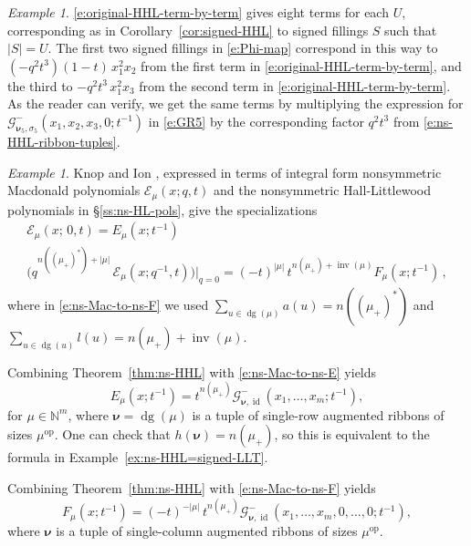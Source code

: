 \documentclass[12pt]{amsart}
\theoremstyle{definition}
\theoremstyle{remark}
\newtheorem{example}[thm]{Example}
\newcommand{\NN}{{\mathbb N}}
\newcommand{\nubold}{{\boldsymbol \nu }}
\newcommand{\Ecal}{{\mathcal E}}
\newcommand{\Gcal}{{\mathcal G}}
\DeclareMathOperator{\dg}{dg}
\DeclareMathOperator{\inv}{inv}
\DeclareMathOperator{\op}{op}
\begin{document}
\begin{example}
\eqref{e:original-HHL-term-by-term} gives eight terms for each $U$,
corresponding as in Corollary~\ref{cor:signed-HHL} to signed fillings
$S$ such that $|S| = U$.  The first two signed fillings in
\eqref{e:Phi-map} correspond in this way to $(-q^{2}t^{3})(1- t)\,
x_{1}^{2}x_{2}$ from the first term in
\eqref{e:original-HHL-term-by-term}, and the third to $-q^{2}t^{3}\,
x_{1}^{2}x_{3}$ from the second term in
\eqref{e:original-HHL-term-by-term}.  As the reader can verify, we get
the same terms by multiplying the expression for $\Gcal _{\nubold
_{5},\sigma _{5}}^{-}(x_{1},x_{2},x_{3},0;t^{-1})$ in \eqref{e:GR5} by
the corresponding factor $q^{2}t^{3}$ from
\eqref{e:ns-HHL-ribbon-tuples}.
\end{example}


\begin{example}\label{ex:E-F}
Knop \cite[Corollary~5.7]{Knop97} and Ion \cite[Theorem~4.8]{Ion08},
expressed in terms of integral form nonsymmetric Macdonald polynomials
$\Ecal _{\mu }(x;q,t)$ and the nonsymmetric Hall-Littlewood
polynomials in \S \ref{ss:ns-HL-pols}, give the specializations
\begin{gather}\label{e:ns-Mac-to-ns-E}
\Ecal _{\mu }(x;\, 0,t) = E_{\mu }(x;t^{-1})\\
\label{e:ns-Mac-to-ns-F}
\bigl(q^{n((\mu _{+})^{*})+|\mu |}\, \Ecal _{\mu }(x;q^{-1},t)
\bigr)\bigr|_{q=0} = (-t)^{|\mu |} \, t^{n(\mu _{+}) + \inv (\mu )}
F_{\mu }(x;t^{-1})\, ,
\end{gather}
where in \eqref{e:ns-Mac-to-ns-F} we used $\sum _{u\in \dg (\mu )}
a(u) = n((\mu _{+})^{*})$ and $\sum _{u\in \dg (u)} l(u) = n(\mu _{+})
+ \inv (\mu )$.

Combining Theorem~\ref{thm:ns-HHL} with \eqref{e:ns-Mac-to-ns-E}
yields
\begin{equation}\label{e:ns-E=signed-LLT}
E_{\mu}(x;t^{-1}) = t^{n(\mu _{+})} \Gcal_{ \nubold,
\operatorname{id} }^-(x_1,\dots, x_m; t^{-1}),
\end{equation}
for $\mu \in \NN ^{m}$, where $\nubold = \dg (\mu )$ is a tuple of
single-row augmented ribbons of sizes $\mu ^{\op }$.  One can check
that $h(\nubold ) = n(\mu _{+})$, so this is equivalent to the formula
in Example~\ref{ex:ns-HHL=signed-LLT}.

Combining Theorem~\ref{thm:ns-HHL} with \eqref{e:ns-Mac-to-ns-F}
yields
\begin{equation}\label{e:ns-F=signed-LLT}
 F_{\mu}(x;t^{-1}) =(-t)^{-|\mu |} \, t^{n(\mu _{+})} \Gcal_{ \nubold,
\operatorname{id} }^-(x_1,\dots, x_m,0,\ldots,0 ; t^{-1}),
\end{equation}
where $\nubold $ is a tuple of single-column augmented ribbons of
sizes $\mu ^{\op }$.

\end{example}
\end{document}
